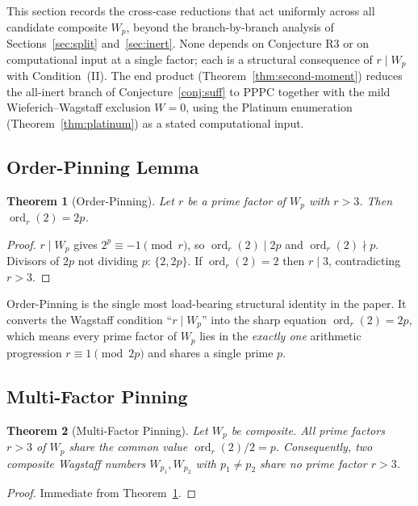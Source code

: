 \documentclass[11pt]{amsart}
\theoremstyle{plain}
\newtheorem{theorem}{Theorem}[section]
\theoremstyle{definition}
\theoremstyle{remark}
\numberwithin{equation}{section}
\newcommand{\ord}{\operatorname{ord}}
\begin{document}
This section records the cross-case reductions that act uniformly across all candidate composite $W_p$, beyond the branch-by-branch analysis of Sections~\ref{sec:split} and~\ref{sec:inert}. None depends on Conjecture R3 or on computational input at a single factor; each is a structural consequence of $r \mid W_p$ with Condition~(II). The end product (Theorem~\ref{thm:second-moment}) reduces the all-inert branch of Conjecture~\ref{conj:suff} to PPPC together with the mild Wieferich--Wagstaff exclusion $W = 0$, using the Platinum enumeration (Theorem~\ref{thm:platinum}) as a stated computational input.

\subsection{Order-Pinning Lemma}

\begin{theorem}[Order-Pinning]\label{thm:order-pinning}
Let $r$ be a prime factor of $W_p$ with $r > 3$. Then $\ord_r(2) = 2 p$.
\end{theorem}

\begin{proof}
$r \mid W_p$ gives $2^p \equiv -1 \pmod r$, so $\ord_r(2) \mid 2 p$ and $\ord_r(2) \nmid p$. Divisors of $2 p$ not dividing $p$: $\{2, 2 p\}$. If $\ord_r(2) = 2$ then $r \mid 3$, contradicting $r > 3$.
\end{proof}

Order-Pinning is the single most load-bearing structural identity in the paper. It converts the Wagstaff condition ``$r \mid W_p$'' into the sharp equation $\ord_r(2) = 2 p$, which means every prime factor of $W_p$ lies in the \emph{exactly one} arithmetic progression $r \equiv 1 \pmod{2 p}$ and shares a single prime $p$.

\subsection{Multi-Factor Pinning}

\begin{theorem}[Multi-Factor Pinning]\label{thm:multi-pinning}
Let $W_p$ be composite. All prime factors $r > 3$ of $W_p$ share the common value $\ord_r(2)/2 = p$. Consequently, two composite Wagstaff numbers $W_{p_1}, W_{p_2}$ with $p_1 \neq p_2$ share no prime factor $r > 3$.
\end{theorem}

\begin{proof}
Immediate from Theorem~\ref{thm:order-pinning}.
\end{proof}
\end{document}
